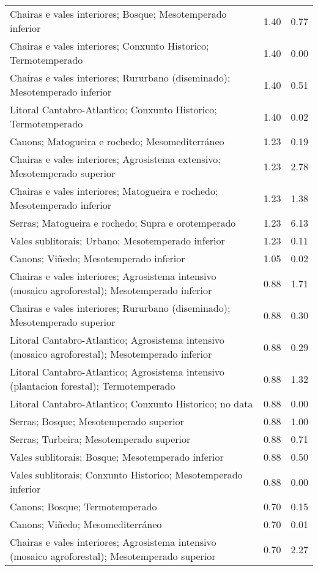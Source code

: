 \begin{table}[p]
\begin{tabular}{lrr}
  Chairas e vales interiores; Bosque; Mesotemperado inferior & 1.40 & 0.77 \\ 
  Chairas e vales interiores; Conxunto Historico; Termotemperado & 1.40 & 0.00 \\ 
  Chairas e vales interiores; Rururbano (diseminado); Mesotemperado inferior & 1.40 & 0.51 \\ 
  Litoral Cantabro-Atlantico; Conxunto Historico; Termotemperado & 1.40 & 0.02 \\ 
  Canons; Matogueira e rochedo; Mesomediterráneo & 1.23 & 0.19 \\ 
  Chairas e vales interiores; Agrosistema extensivo; Mesotemperado superior & 1.23 & 2.78 \\ 
  Chairas e vales interiores; Matogueira e rochedo; Mesotemperado inferior & 1.23 & 1.38 \\ 
  Serras; Matogueira e rochedo; Supra e orotemperado & 1.23 & 6.13 \\ 
  Vales sublitorais; Urbano; Mesotemperado inferior & 1.23 & 0.11 \\ 
  Canons; Viñedo; Mesotemperado inferior & 1.05 & 0.02 \\ 
  Chairas e vales interiores; Agrosistema intensivo (mosaico agroforestal); Mesotemperado inferior & 0.88 & 1.71 \\ 
  Chairas e vales interiores; Rururbano (diseminado); Mesotemperado superior & 0.88 & 0.30 \\ 
  Litoral Cantabro-Atlantico; Agrosistema intensivo (mosaico agroforestal); Mesotemperado inferior & 0.88 & 0.29 \\ 
  Litoral Cantabro-Atlantico; Agrosistema intensivo (plantacion forestal); Termotemperado & 0.88 & 1.32 \\ 
  Litoral Cantabro-Atlantico; Conxunto Historico; no data & 0.88 & 0.00 \\ 
  Serras; Bosque; Mesotemperado superior & 0.88 & 1.00 \\ 
  Serras; Turbeira; Mesotemperado superior & 0.88 & 0.71 \\ 
  Vales sublitorais; Bosque; Mesotemperado inferior & 0.88 & 0.50 \\ 
  Vales sublitorais; Conxunto Historico; Mesotemperado inferior & 0.88 & 0.00 \\ 
  Canons; Bosque; Termotemperado & 0.70 & 0.15 \\ 
  Canons; Viñedo; Mesomediterráneo & 0.70 & 0.01 \\ 
  Chairas e vales interiores; Agrosistema intensivo (mosaico agroforestal); Mesotemperado superior & 0.70 & 2.27 \\ 

\end{tabular}
\end{table}
